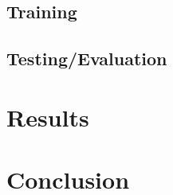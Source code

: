 \documentclass[conference]{IEEEtran}
\begin{document}
\subsection{Training}


\subsection{Testing/Evaluation}



\section{Results}
\label{sec:results}

\section{Conclusion}
\label{sec:conclusion}

\clearpage
\appendix
\end{document}
